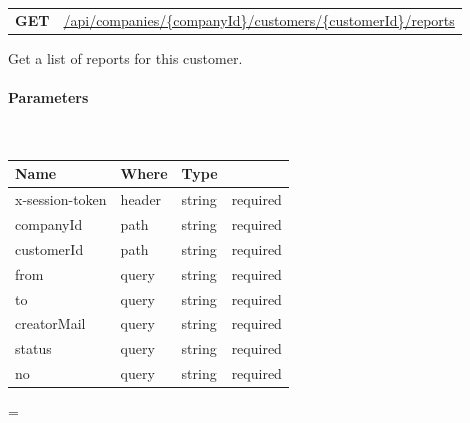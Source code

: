 \documentclass[10pt]{article}
\newcommand{\method}[2]{
    \begin{mdframed}[style=#1]
        \color{white}
        \begin{tabularx}{\textwidth}{lX}
            \MakeUppercase{\textbf{#1}} & #2 \\
        \end{tabularx}
    \end{mdframed}
}
\newenvironment{absolutelynopagebreak}
  {\par\nobreak\vfil\penalty0\vfilneg
   \vtop\bgroup}
  {\par\xdef\tpd{\the\prevdepth}\egroup
   \prevdepth=\tpd}
\begin{document}
            \vspace{.5cm}
            \begin{absolutelynopagebreak}
                \label{route:18cae791ac629c91d346091490a22f29}
                \method{get}{\url{/api/companies/{companyId}/customers/{customerId}/reports}}

                \begin{flushleft}
                    Get a list of reports for this customer.
                    \vspace{.25cm}

                    \paragraph{Parameters}\mbox{}\\
                    \vspace{.25cm}
                    \begin{tabularx}{\textwidth}{lXlr}
                        \textbf{Name} & \textbf{Where} & \textbf{Type} \\
                        \hline
                            x-session-token & header & string & required \\
                            companyId & path & string & required \\
                            customerId & path & string & required \\
                            from & query & string & required \\
                            to & query & string & required \\
                            creatorMail & query & string & required \\
                            status & query & string & required \\
                            no & query & string & required \\
                    \end{tabularx}


\end{flushleft}
\end{absolutelynopagebreak}
\end{document}
